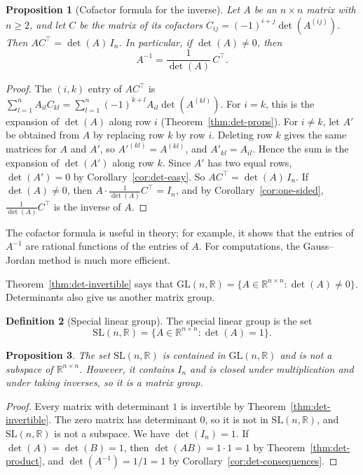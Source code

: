 \documentclass[11pt]{article}
\theoremstyle{definition}
\newtheorem{definition}{Definition}[section]
\theoremstyle{plain}
\newtheorem{proposition}[definition]{Proposition}
\theoremstyle{remark}
\begin{document}
\begin{proposition}[Cofactor formula for the inverse]\label{prop:adjugate}
    Let $A$ be an $n \times n$ matrix with $n \geq 2$, and let $C$ be the matrix of its cofactors $C_{ij} = (-1)^{i+j}\det(A^{(ij)})$. Then $AC^\top = \det(A)\, I_n$. In particular, if $\det(A) \neq 0$, then
    \[A^{-1} = \frac{1}{\det(A)}\, C^\top.\]
\end{proposition}

\begin{proof}
    The $(i, k)$ entry of $AC^\top$ is $\sum_{l=1}^n A_{il} C_{kl} = \sum_{l=1}^n (-1)^{k+l} A_{il}\det(A^{(kl)})$. For $i = k$, this is the expansion of $\det(A)$ along row $i$ (Theorem~\ref{thm:det-props}). For $i \neq k$, let $A'$ be obtained from $A$ by replacing row $k$ by row $i$. Deleting row $k$ gives the same matrices for $A$ and $A'$, so $A'^{(kl)} = A^{(kl)}$, and $A'_{kl} = A_{il}$. Hence the sum is the expansion of $\det(A')$ along row $k$. Since $A'$ has two equal rows, $\det(A') = 0$ by Corollary~\ref{cor:det-easy}. So $AC^\top = \det(A)\, I_n$. If $\det(A) \neq 0$, then $A \cdot \frac{1}{\det(A)}C^\top = I_n$, and by Corollary~\ref{cor:one-sided}, $\frac{1}{\det(A)}C^\top$ is the inverse of $A$.
\end{proof}

The cofactor formula is useful in theory; for example, it shows that the entries of $A^{-1}$ are rational functions of the entries of $A$. For computations, the Gauss--Jordan method is much more efficient.

Theorem~\ref{thm:det-invertible} says that $\mathrm{GL}(n, \mathbb{R}) = \{A \in \mathbb{R}^{n \times n} : \det(A) \neq 0\}$. Determinants also give us another matrix group.

\begin{definition}[Special linear group]
    The special linear group is the set
    \[\mathrm{SL}(n, \mathbb{R}) = \{A \in \mathbb{R}^{n \times n} : \det(A) = 1\}.\]
\end{definition}

\begin{proposition}
    The set $\mathrm{SL}(n, \mathbb{R})$ is contained in $\mathrm{GL}(n, \mathbb{R})$ and is not a subspace of $\mathbb{R}^{n \times n}$. However, it contains $I_n$ and is closed under multiplication and under taking inverses, so it is a matrix group.
\end{proposition}

\begin{proof}
    Every matrix with determinant $1$ is invertible by Theorem~\ref{thm:det-invertible}. The zero matrix has determinant $0$, so it is not in $\mathrm{SL}(n, \mathbb{R})$, and $\mathrm{SL}(n, \mathbb{R})$ is not a subspace. We have $\det(I_n) = 1$. If $\det(A) = \det(B) = 1$, then $\det(AB) = 1 \cdot 1 = 1$ by Theorem~\ref{thm:det-product}, and $\det(A^{-1}) = 1/1 = 1$ by Corollary~\ref{cor:det-consequences}.
\end{proof}
\end{document}
